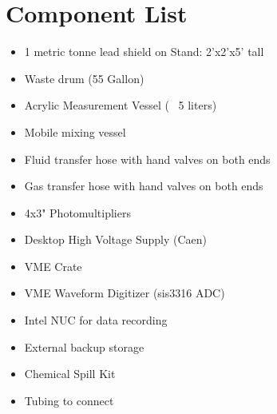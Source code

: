 \documentclass[]{article}
\begin{document}
\section{Component List}
\begin{itemize}
  \item 1 metric tonne lead shield on Stand: 2'x2'x5' tall
  \item Waste drum (55 Gallon)
  \item Acrylic Measurement Vessel (~ 5 liters)
  \item Mobile mixing vessel
  \item Fluid transfer hose with hand valves on both ends
  \item Gas transfer hose with hand valves on both ends
  \item 4x3" Photomultipliers
  \item Desktop High Voltage Supply (Caen)
  \item VME Crate
  \item VME Waveform Digitizer (sis3316 ADC)
  \item Intel NUC for data recording
  \item External backup storage
  \item Chemical Spill Kit
  \item Tubing to connect
\end{itemize}

\end{document}
